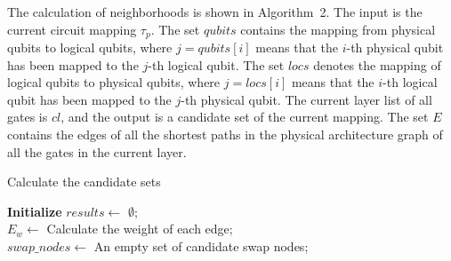 \documentclass[journal]{IEEEtran}
\begin{document}
The calculation of neighborhoods is shown in Algorithm~2. %
The input is the current circuit mapping $\tau_{p}$. The set $qubits$ contains the mapping from physical qubits to logical qubits, where $ j = qubits [i] $ means that the $i$-th physical qubit has been mapped to the $j$-th logical qubit. The set $ locs $ denotes the mapping of logical qubits to physical qubits, where $ j = locs [i] $ means that the $i$-th logical qubit has been mapped to the $j$-th physical qubit.
The current layer list of all gates is $cl$, and the output is a candidate set of the current mapping. The set $E$ contains the edges of all the shortest paths in the physical architecture graph of all the gates in the current layer. 
\begin{algorithm} [htbp]
	\caption{Calculate the candidate sets }  
	\LinesNumbered  
	\textbf{Initialize}  $results \leftarrow$ $\emptyset$;\\
					$E_{w} \leftarrow$ Calculate the weight of each edge;\\
					$swap\_nodes \leftarrow $ An empty set of candidate swap nodes;\\  
					
					

\end{algorithm}
\end{document}
